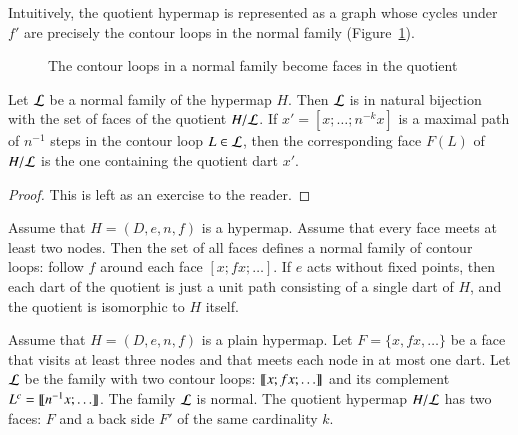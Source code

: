 Intuitively, the quotient hypermap is represented as a graph whose
cycles under $f'$ are precisely the contour loops in the normal family
(Figure~\ref{fig:quot}).


\begin{figure}[htb]
\centering
{}
\caption{The contour loops in a normal family become faces in the
quotient}
\label{fig:quot}
\end{figure}

\begin{lemma}\label{lemma:quotient-bijection}
Let ${\cal L}$ be a normal family of the hypermap $H$.  Then ${\cal L}$ is in
natural bijection with the set of faces
of the quotient $H/{\cal L}$.  If $x'=[x;\ldots;n^{-k}x]$ is a maximal path of $n^{-1}$ steps in
the contour loop
$L\in{\cal L}$, then the corresponding face $F(L)$ of $H/{\cal L}$ is the one containing the
quotient dart $x'$.
\end{lemma}

\begin{proof}  This is left as an exercise to the reader.
\end{proof}


\begin{example}\label{ex:Hall} 
Assume that $H=(D,e,n,f)$ is a hypermap. %
Assume that every face meets at least two nodes. Then the set of all faces
defines a normal family of contour loops: follow $f$ around each
face $[x;f x;\ldots]$.  If $e$ acts without fixed points, then each dart of the quotient is just a
unit path consisting of a single dart of $H$, and the quotient
is isomorphic to $H$ itself.
\end{example}

\begin{example}\label{ex:H2} 
  Assume that $H=(D,e,n,f)$ is a plain hypermap.  Let $F = \{x,f x,\ldots\}$ be a face
  that visits at least three nodes and that meets each node in at most
  one dart.  Let $\cal L$ be the family with two contour loops: ${\llbracket{x;f x;\ldots}\rrbracket}$ 
and its complement $L^c = {\llbracket{n^{-1} x;\ldots}\rrbracket}$.
The family $\cal L$ is normal. The quotient hypermap $H/{\cal L}$ has
two faces: $F$ and a back side $F'$ of the same cardinality $k$.
%
\end{example}

